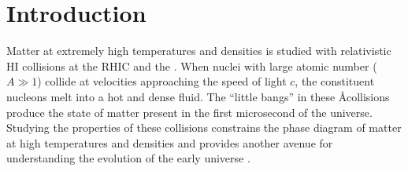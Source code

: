 \chapter{Introduction}
\label{ch:intro}


 


Matter at extremely high temperatures and densities is studied with relativistic \ac{HI} collisions at the \ac{RHIC} and the \lhc.
When nuclei with large atomic number ($A \gg 1$) collide at velocities approaching the speed of light $c$, the constituent nucleons melt into a hot and dense fluid.
The ``little bangs'' in these \AA collisions produce the state of matter present in the first microsecond of the universe.
Studying the properties of these collisions constrains the phase diagram of matter at high temperatures and densities and provides another avenue for understanding the evolution of the early universe \cite{Busza:2018rrf}.

